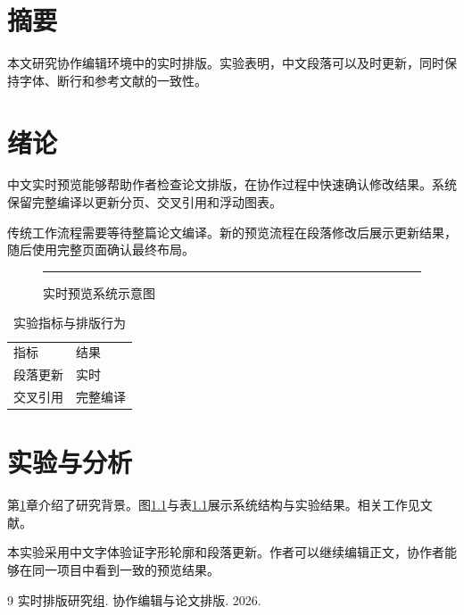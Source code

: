 \documentclass[UTF8,fontset=fandol,oneside,openany]{ctexbook}
\begin{document}
\chapter*{摘要}
本文研究协作编辑环境中的实时排版。实验表明，中文段落可以及时更新，同时保持字体、断行和参考文献的一致性。
\clearpage
\chapter{绪论}
\label{chapter:introduction}
中文实时预览能够帮助作者检查论文排版，在协作过程中快速确认修改结果。系统保留完整编译以更新分页、交叉引用和浮动图表。

传统工作流程需要等待整篇论文编译。新的预览流程在段落修改后展示更新结果，随后使用完整页面确认最终布局。
\begin{figure}[ht]
\centering\rule{6cm}{2cm}
\caption{实时预览系统示意图}\label{figure:system}
\end{figure}
\begin{table}[ht]
\centering
\begin{tabular}{ll}指标&结果\\段落更新&实时\\交叉引用&完整编译\end{tabular}
\caption{实验指标与排版行为}\label{table:results}
\end{table}
\clearpage
\chapter{实验与分析}
第\ref{chapter:introduction}章介绍了研究背景。图\ref{figure:system}与表\ref{table:results}展示系统结构与实验结果。相关工作见文献\cite{preview}。

本实验采用中文字体验证字形轮廓和段落更新。作者可以继续编辑正文，协作者能够在同一项目中看到一致的预览结果。
\clearpage
\begin{thebibliography}{9}
 实时排版研究组. 协作编辑与论文排版. 2026.
\end{thebibliography}
\end{document}
